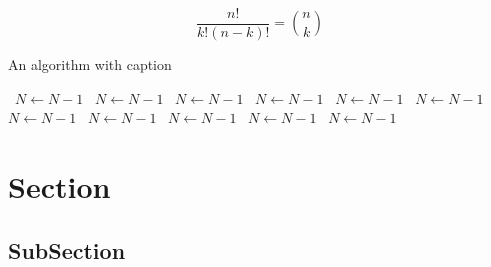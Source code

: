 \documentclass[a4paper]{article}
\begin{document}
\[ \frac{n!}{k!(n-k)!} = \binom{n}{k} \]

\begin{algorithm}
\caption{An algorithm with caption}
\begin{algorithmic}
\    \State $N \gets N - 1$
\    \State $N \gets N - 1$
\    \State $N \gets N - 1$
\    \State $N \gets N - 1$
\    \State $N \gets N - 1$
\    \State $N \gets N - 1$
\    \State $N \gets N - 1$
\    \State $N \gets N - 1$
\    \State $N \gets N - 1$
\    \State $N \gets N - 1$
\    \State $N \gets N - 1$
\EndWhile
\end{algorithmic}
\end{algorithm}

\section{Section}

\subsection{SubSection}
\end{document}
